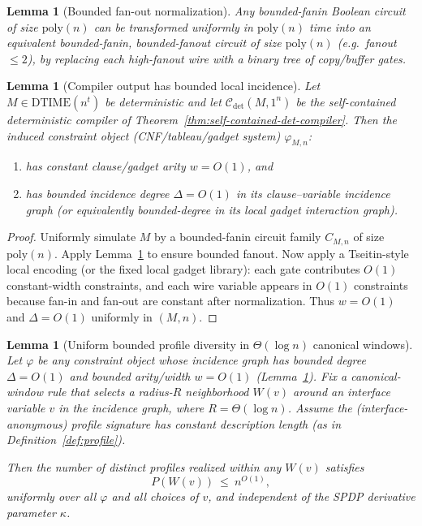 \documentclass[12pt]{article}
\newcommand{\poly}{\mathrm{poly}}
\newcommand{\Comp}{\mathcal{C}}
\newtheorem{lemma}[theorem]{Lemma}
\theoremstyle{definition}
\theoremstyle{definition}
\theoremstyle{remark}
\theoremstyle{remark}
\begin{document}
\begin{lemma}[Bounded fan-out normalization]
\label{lem:bounded-fanout-normalization}
Any bounded-fanin Boolean circuit of size $\poly(n)$ can be transformed uniformly
in $\poly(n)$ time into an equivalent bounded-fanin, bounded-fanout circuit of
size $\poly(n)$ (e.g.\ fanout $\le 2$), by replacing each high-fanout wire with a
binary tree of copy/buffer gates.
\end{lemma}

\begin{lemma}[Compiler output has bounded local incidence]
\label{lem:compiler-bounded-degree}
Let $M\in \mathrm{DTIME}(n^t)$ be deterministic and let $\Comp_{\det}(M,1^n)$ be the
self-contained deterministic compiler of Theorem~\ref{thm:self-contained-det-compiler}.
Then the induced constraint object (CNF/tableau/gadget system) $\varphi_{M,n}$:
\begin{enumerate}[label=(\roman*)]
\item has constant clause/gadget arity $w=O(1)$, and
\item has bounded incidence degree $\Delta=O(1)$ in its clause--variable incidence graph
(or equivalently bounded-degree in its local gadget interaction graph).
\end{enumerate}
\end{lemma}

\begin{proof}
Uniformly simulate $M$ by a bounded-fanin circuit family $C_{M,n}$ of size $\poly(n)$.
Apply Lemma~\ref{lem:bounded-fanout-normalization} to ensure bounded fanout.
Now apply a Tseitin-style local encoding (or the fixed local gadget library):
each gate contributes $O(1)$ constant-width constraints, and each wire variable
appears in $O(1)$ constraints because fan-in and fan-out are constant after normalization.
Thus $w=O(1)$ and $\Delta=O(1)$ uniformly in $(M,n)$.
\end{proof}

\begin{lemma}[Uniform bounded profile diversity in $\Theta(\log n)$ canonical windows]
\label{lem:uniform-bounded-profile-diversity}
Let $\varphi$ be any constraint object whose incidence graph has bounded degree
$\Delta=O(1)$ and bounded arity/width $w=O(1)$ (Lemma~\ref{lem:compiler-bounded-degree}).
Fix a canonical-window rule that selects a radius-$R$ neighborhood $W(v)$ around an
interface variable $v$ in the incidence graph, where $R=\Theta(\log n)$.
Assume the (interface-anonymous) profile signature has constant description length
(as in Definition~\ref{def:profile}).

Then the number of distinct profiles realized within any $W(v)$ satisfies
\[
P(W(v))\ \le\ n^{O(1)},
\]
uniformly over all $\varphi$ and all choices of $v$, and independent of the SPDP
derivative parameter $\kappa$.
\end{lemma}
\end{document}
